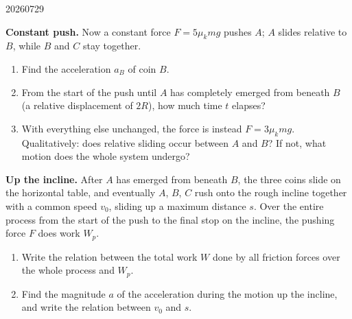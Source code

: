 \begin{problem}{20260729}
\begin{questions}
  \item \textbf{Constant push.}
        Now a constant force $F = 5\mu_k m g$ pushes $A$; $A$ slides relative to $B$, while $B$ and $C$ stay together.
        \begin{enumerate}[label=\arabic*.]
          \item Find the acceleration $a_B$ of coin $B$.
          \item From the start of the push until $A$ has completely emerged from beneath $B$ (a relative displacement of $2R$), how much time $t$ elapses?
          \item With everything else unchanged, the force is instead $F = 3\mu_k m g$.  Qualitatively: does relative sliding occur between $A$ and $B$?  If not, what motion does the whole system undergo?
        \end{enumerate}

  \item \textbf{Up the incline.}
        After $A$ has emerged from beneath $B$, the three coins slide on the horizontal table, and eventually $A$, $B$, $C$ rush onto the rough incline together with a common speed $v_0$, sliding up a maximum distance $s$.  Over the entire process from the start of the push to the final stop on the incline, the pushing force $F$ does work $W_p$.
        \begin{enumerate}[label=\arabic*.]
          \item Write the relation between the total work $W$ done by all friction forces over the whole process and $W_p$.
          \item Find the magnitude $a$ of the acceleration during the motion up the incline, and write the relation between $v_0$ and $s$.
        \end{enumerate}
\end{questions}

\end{problem}

